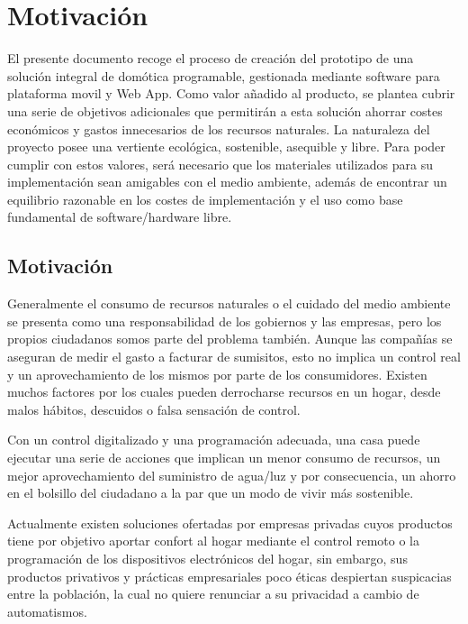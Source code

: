 \cleardoublepage

\chapter{Motivación}

\label{makereference}
El presente documento recoge el proceso de creación del prototipo de una solución integral de domótica programable, gestionada mediante software para plataforma movil y Web App. Como valor añadido al producto, se plantea cubrir una serie de objetivos adicionales que permitirán a esta solución ahorrar costes económicos y gastos innecesarios de los recursos naturales. La naturaleza del proyecto posee una vertiente ecológica, sostenible, asequible y libre. Para poder cumplir con estos valores, será necesario que los materiales utilizados para su implementación sean amigables con el medio ambiente, además de encontrar un equilibrio razonable en los costes de implementación y el uso como base fundamental de software/hardware libre.

\section{Motivación}
\label{makereference1.1}

Generalmente el consumo de recursos naturales o el cuidado del medio ambiente se presenta como una responsabilidad de los gobiernos y las empresas, pero los propios ciudadanos somos parte del problema también. Aunque las compañías se aseguran de medir el gasto a facturar de sumisitos, esto no implica un control real y un aprovechamiento de los mismos por parte de los consumidores. Existen muchos factores por los cuales pueden derrocharse recursos en un hogar, desde malos hábitos, descuidos o falsa sensación de control.

Con un control digitalizado y una programación adecuada, una casa puede ejecutar una serie de acciones que implican un menor consumo de recursos, un mejor aprovechamiento del suministro de agua/luz y por consecuencia, un ahorro en el bolsillo del ciudadano a la par que un modo de vivir más sostenible.

Actualmente existen soluciones ofertadas por empresas privadas cuyos productos tiene por objetivo aportar confort al hogar mediante el control remoto o la programación de los dispositivos electrónicos del hogar, sin embargo, sus productos privativos y prácticas empresariales poco éticas despiertan suspicacias entre la población, la cual no quiere renunciar  a su privacidad a cambio de automatismos.


